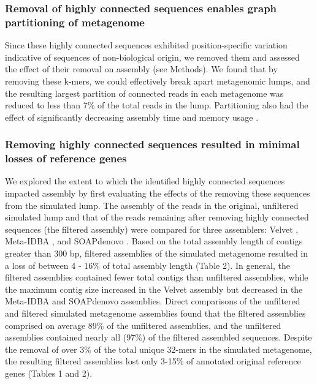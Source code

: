 \documentclass[10pt]{article}
\begin{document}
\subsubsection*{Removal of highly connected sequences enables graph partitioning of metagenome}

Since these highly connected sequences exhibited position-specific
variation indicative of sequences of non-biological origin, we removed
them and assessed the effect of their removal on assembly (see
Methods).  We found that by removing these k-mers, we could
effectively break apart metagenomic lumps, and the resulting largest
partition of connected reads in each metagenome was reduced to less
than 7\% of the total reads in the lump.  Partitioning also had the
effect of significantly decreasing assembly time and memory usage
\cite{Pell:2012cq}.

\subsubsection*{Removing highly connected sequences resulted in minimal losses of reference genes}

We explored the extent
to which the identified highly connected
sequences impacted assembly by first evaluating the effects of the
removing these sequences from the simulated lump.  The assembly of the reads in the original,
unfiltered simulated lump and that of the reads remaining after
removing highly connected sequences (the filtered assembly) were
compared for three assemblers: Velvet \cite{Zerbino:2008p665}, Meta-IDBA \cite{Peng:2011p898}, and SOAPdenovo \cite{Li:2010p234}.
Based on the total assembly length of contigs greater than 300 bp,
filtered assemblies of the simulated metagenome resulted in a loss of
between 4 - 16\% of total assembly length (Table 2).  In general, the
filtered assemblies contained fewer total contigs than unfiltered
assemblies, while the maximum contig size increased in the Velvet
assembly but decreased in the Meta-IDBA and SOAPdenovo assemblies.
Direct comparisons of the unfiltered and filtered simulated metagenome assemblies found
that the filtered assemblies comprised on average 89\% of the
unfiltered assemblies, and the unfiltered assemblies contained nearly
all (97\%) of the filtered assembled sequences.  Despite the removal
of over 3\% of the total unique 32-mers in the simulated metagenome,
the resulting filtered assemblies lost only 3-15\% of annotated original reference genes (Tables 1 and 2).
\end{document}
